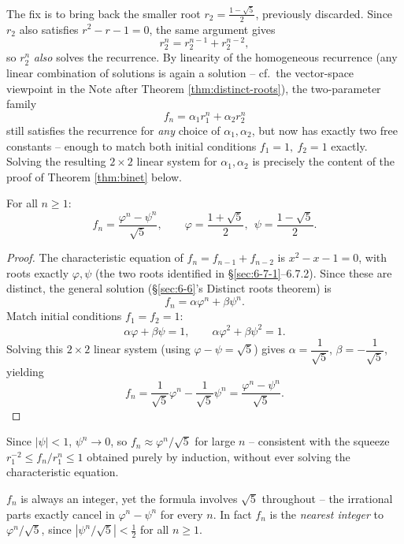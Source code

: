 \documentclass[11pt]{article}
\begin{document}
\smallskip
\noindent The fix is to bring back the smaller root $r_2=\frac{1-\sqrt5}{2}$, previously discarded. Since $r_2$ also satisfies $r^2-r-1=0$, the same argument gives
\[
r_2^n=r_2^{n-1}+r_2^{n-2},
\]
so $r_2^n$ \emph{also} solves the recurrence. By linearity of the homogeneous recurrence (any linear combination of solutions is again a solution -- cf.\ the vector-space viewpoint in the Note after Theorem \ref{thm:distinct-roots}), the two-parameter family
\[
f_n=\alpha_1r_1^n+\alpha_2r_2^n
\]
still satisfies the recurrence for \emph{any} choice of $\alpha_1,\alpha_2$, but now has exactly two free constants -- enough to match both initial conditions $f_1=1,\ f_2=1$ exactly. Solving the resulting $2\times2$ linear system for $\alpha_1,\alpha_2$ is precisely the content of the proof of Theorem \ref{thm:binet} below.


\begin{theorem} \label{thm:binet}
For all $n\ge1$:
\[
f_n = \frac{\varphi^n - \psi^n}{\sqrt5}, \qquad \varphi=\frac{1+\sqrt5}{2},\ \ \psi=\frac{1-\sqrt5}{2}.
\]
\end{theorem}
\begin{proof}
The characteristic equation of $f_n=f_{n-1}+f_{n-2}$ is $x^2-x-1=0$, with roots exactly $\varphi,\psi$ (the two roots identified in \S\ref{sec:6-7-1}--6.7.2). Since these are distinct, the general solution (\S\ref{sec:6-6}'s Distinct roots theorem) is
\[
f_n = \alpha\varphi^n + \beta\psi^n.
\]
Match initial conditions $f_1=f_2=1$:
\[
\alpha\varphi+\beta\psi = 1, \qquad \alpha\varphi^2+\beta\psi^2 = 1.
\]
Solving this $2\times2$ linear system (using $\varphi-\psi=\sqrt5$) gives $\alpha=\dfrac{1}{\sqrt5}$, $\beta=-\dfrac{1}{\sqrt5}$, yielding
\[
f_n = \frac{1}{\sqrt5}\varphi^n - \frac{1}{\sqrt5}\psi^n = \frac{\varphi^n-\psi^n}{\sqrt5}.
\]
\end{proof}

\begin{note}
Since $|\psi|<1$, $\psi^n\to0$, so $f_n \approx \varphi^n/\sqrt5$ for large $n$ -- consistent with the squeeze $r_1^{-2}\le f_n/r_1^n\le1$ obtained purely by induction, without ever solving the characteristic equation.
\end{note}

\begin{note}
$f_n$ is always an integer, yet the formula involves $\sqrt5$ throughout -- the irrational parts exactly cancel in $\varphi^n-\psi^n$ for every $n$. In fact $f_n$ is the \emph{nearest integer} to $\varphi^n/\sqrt5$, since $|\psi^n/\sqrt5|<\tfrac12$ for all $n\ge1$.
\end{note}
\end{document}
